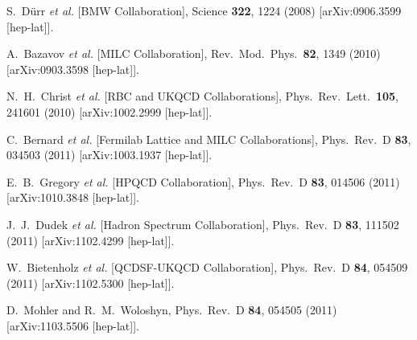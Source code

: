 \begin{thebibliography}{99}
  S.~D{\"u}rr {\it et al.} [BMW Collaboration],
  Science {\bf 322}, 1224 (2008)
  [arXiv:0906.3599 [hep-lat]].
  
  A.~Bazavov {\it et al.} [MILC Collaboration],
  Rev.\ Mod.\ Phys.\  {\bf 82}, 1349 (2010)
  [arXiv:0903.3598 [hep-lat]].

  N.~H.~Christ {\it et al.} [RBC and UKQCD Collaborations],
  Phys.\ Rev.\ Lett.\  {\bf 105}, 241601 (2010)
  [arXiv:1002.2999 [hep-lat]].
  
  C.~Bernard {\it et al.}  [Fermilab Lattice and MILC Collaborations],
  Phys.\ Rev.\ D {\bf 83}, 034503 (2011)
  [arXiv:1003.1937 [hep-lat]].
  
  E.~B.~Gregory {\it et al.} [HPQCD Collaboration],
  Phys.\ Rev.\ D {\bf 83}, 014506 (2011)
  [arXiv:1010.3848 [hep-lat]].
  
  J.~J.~Dudek {\it et al.} [Hadron Spectrum Collaboration],
  Phys.\ Rev.\ D {\bf 83}, 111502 (2011)
  [arXiv:1102.4299 [hep-lat]].
  
  W.~Bietenholz {\it et al.} [QCDSF-UKQCD Collaboration],
  Phys.\ Rev.\ D {\bf 84}, 054509 (2011)
  [arXiv:1102.5300 [hep-lat]].
  
  D.~Mohler and R.~M.~Woloshyn,
  Phys.\ Rev.\ D {\bf 84}, 054505 (2011)
  [arXiv:1103.5506 [hep-lat]].
  

\end{thebibliography}
